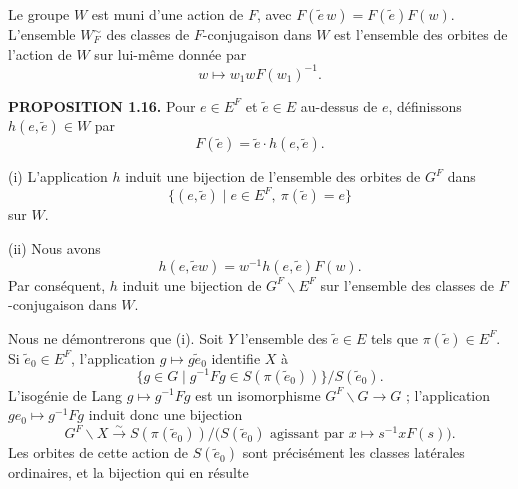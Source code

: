 \documentclass[9pt,twoside]{extarticle}
\begin{document}
{Le groupe \(W\) est muni d'une action de \(F\), avec \(F(\widetilde e\,w)=F(\widetilde e)F(w)\). L'ensemble \(W_F^{\sim}\) des classes de \(F\)-conjugaison dans \(W\) est l'ensemble des orbites de l'action de \(W\) sur lui-même donnée par \[
w\longmapsto w_1wF(w_1)^{-1}.
\]\par

\noindent\textbf{PROPOSITION 1.16.} Pour \(e\in E^F\) et \(\widetilde e\in E\) au-dessus de \(e\), définissons \(h(e,\widetilde e)\in W\) par \[
F(\widetilde e)=\widetilde e\cdot h(e,\widetilde e).
\]\par

(i) L'application \(h\) induit une bijection de l'ensemble des orbites de \(G^F\) dans \[
\{(e,\widetilde e)\mid e\in E^F,\ \pi(\widetilde e)=e\}
\] sur \(W\).\par

(ii) Nous avons \[
h(e,\widetilde e w)=w^{-1}h(e,\widetilde e)F(w).
\] Par conséquent, \(h\) induit une bijection de \(G^F\backslash E^F\) sur l'ensemble des classes de \(F\)-conjugaison dans \(W\).\par

Nous ne démontrerons que (i). Soit \(Y\) l'ensemble des \(\widetilde e\in E\) tels que \(\pi(\widetilde e)\in E^F\). Si \(\widetilde e_0\in E^F\), l'application \(g\mapsto g\widetilde e_0\) identifie \(X\) à \[
\{g\in G\mid g^{-1}Fg\in S(\pi(\widetilde e_0))\}/S(\widetilde e_0).
\] L'isogénie de Lang \(g\mapsto g^{-1}Fg\) est un isomorphisme \(G^F\backslash G\to G\) ; l'application \(ge_0\mapsto g^{-1}Fg\) induit donc une bijection \[
G^F\backslash X\xrightarrow{\sim}S(\pi(\widetilde e_0))/\bigl(S(\widetilde e_0)\text{ agissant par }x\mapsto s^{-1}xF(s)\bigr).
\] Les orbites de cette action de \(S(\widetilde e_0)\) sont précisément les classes latérales ordinaires, et la bijection qui en résulte\par
}
\end{document}
